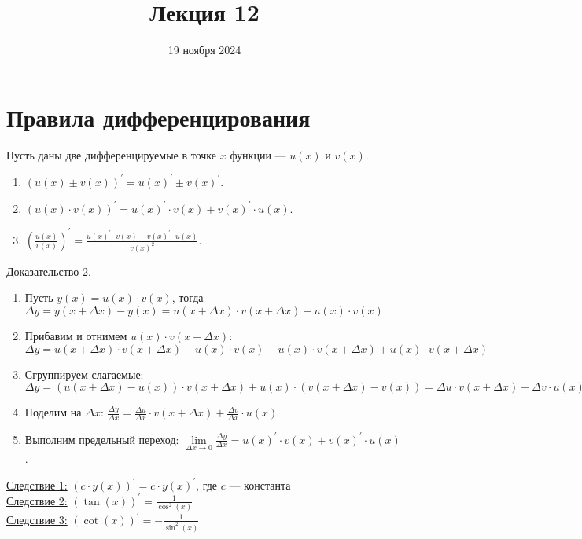 \documentclass{article}
\title{Лекция 12}
\author{19 ноября 2024}
\date{}
\begin{document}
\maketitle

\section*{Правила дифференцирования}

\begin{theorem}
    Пусть даны две дифференцируемые в точке \(x\) функции --- \(u(x)\) и \(v(x)\).
    \begin{enumerate}
        \item \((u(x) \pm v(x))^{\prime} = u(x)^{\prime} \pm v(x)^{\prime}\).
        \item \((u(x) \cdot v(x))^{\prime} = u(x)^{\prime} \cdot v(x) + v(x)^{\prime} \cdot u(x)\).
        \item \(\displaystyle \left(\frac{u(x)}{v(x)}\right)^{\prime} = \frac{u(x)^{\prime} \cdot v(x) - v(x)^{\prime} \cdot u(x)}{v(x)^2}\).  
    \end{enumerate}   
\end{theorem}
\noindent
\underline{Доказательство 2.}
\begin{enumerate}
    \item Пусть \(\displaystyle y(x) = u(x) \cdot v(x)\), тогда \(\Delta y = y(x + \Delta x) - y(x) = u(x + \Delta x) \cdot v(x + \Delta x) - u(x) \cdot v(x)\)
    \item Прибавим и отнимем \(u(x) \cdot v(x + \Delta x)\): \(\Delta y = u(x + \Delta x) \cdot v(x + \Delta x) - u(x) \cdot v(x) - u(x) \cdot v(x + \Delta x) + u(x) \cdot v(x + \Delta x)\)
    \item Сгруппируем слагаемые: \(\Delta y = (u(x + \Delta x) - u(x)) \cdot v(x + \Delta x) + u(x) \cdot (v(x + \Delta x) - v(x)) = \Delta u \cdot v(x + \Delta x) + \Delta v \cdot u(x)\) 
    \item Поделим на \(\Delta x\): \(\displaystyle \frac{\Delta y}{\Delta x} = \frac{\Delta u}{\Delta x} \cdot v(x + \Delta x) + \frac{\Delta v}{\Delta x} \cdot u(x)\) 
    \item Выполним предельный переход: \(\displaystyle \lim\limits_{\Delta x \to 0} \frac{\Delta y}{\Delta x} = u(x)^{\prime} \cdot v(x) + v(x)^{\prime} \cdot u(x)\).
\end{enumerate}
\noindent
\underline{Следствие 1:} \((c \cdot y(x))^{\prime} = c \cdot y(x)^{\prime}\), где \(c\) --- константа\\
\underline{Следствие 2:} \(\displaystyle (\tan(x))^{\prime} = \frac{1}{\cos^2(x)}\)\\
\underline{Следствие 3:} \(\displaystyle (\cot(x))^{\prime} = -\frac{1}{\sin^2(x)}\)
\end{document}
